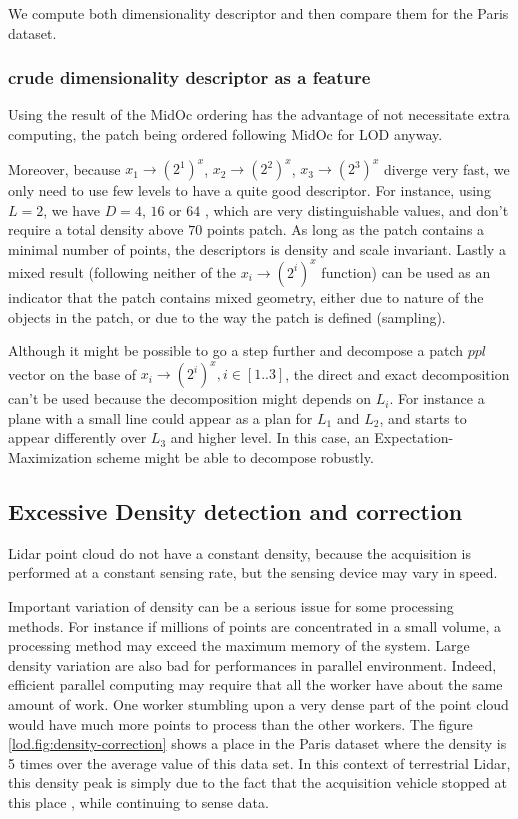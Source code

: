 		We compute both dimensionality descriptor and then compare them for the Paris dataset.
		
		\subsubsection{crude dimensionality descriptor as a feature}

		Using the result of the MidOc ordering has the advantage of not necessitate extra computing,
		the patch being ordered following MidOc for LOD anyway.
		
		Moreover, because $x_1 \rightarrow (2^1)^x$,
		$x_2 \rightarrow (2^2)^x$, $x_3 \rightarrow (2^3)^x$ diverge very fast,
		we only need to use few levels to have a quite good descriptor.
		For instance, using $L=2$, we have $D=4$, $16$ or $64$ , which are very distinguishable values, and don't require a total density above $70$ points \per patch.  
		As long as the patch contains a minimal number of points, the descriptors is density and scale invariant.
		Lastly a mixed result (following neither of the $x_i \rightarrow (2^i)^x$ function) can be used as an indicator that the patch contains mixed geometry, either due to nature of the objects in the patch, or due to the way the patch is defined (sampling).
		
		Although it might be possible to go a step further and decompose a patch $ppl$ vector on the base of $x_i \rightarrow (2^i)^x, i \in [1..3]$, the direct and exact decomposition can't be used because the decomposition might depends on $L_i$. For instance a plane with a small line could appear as a plan for $L_1$ and $L_2$, and starts to appear differently over $L_3$ and higher level. In this case, an Expectation-Maximization scheme might be able to decompose robustly.
 
	\subsection{Excessive Density detection and correction}
		\label{lod.method.density}
		Lidar point cloud do not have a constant density, because the acquisition is performed at a constant sensing rate, but the sensing device may vary in speed.
		
		Important variation of density can be a serious issue for some processing methods. 
		For instance if millions of points are concentrated in a small volume,
		a processing method may exceed the maximum memory of the system.
		Large density variation are also bad for performances in parallel environment.
		Indeed, efficient parallel computing may require that all the worker have about the same amount of work.
		One worker stumbling upon a very dense part of the point cloud would have much more points to process than the other workers.
		The figure \ref{lod.fig:density-correction} shows a place in the Paris dataset where the density is 5 times over the average value of this data set.
		In this context of terrestrial Lidar, this density peak is simply due to the fact that the acquisition vehicle stopped at this place
		, while continuing to sense data.
		
